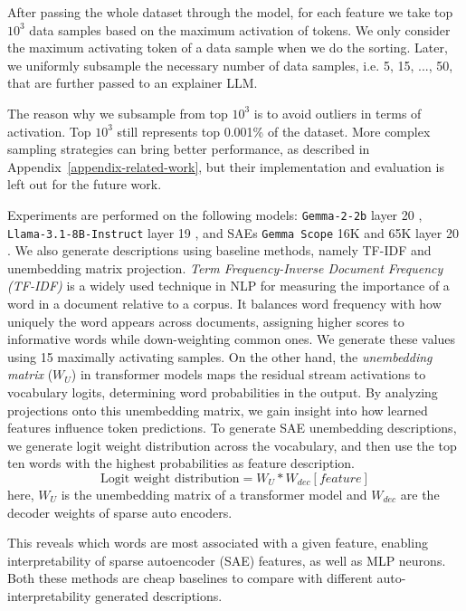 After passing the whole dataset through the model, for each feature we take top $10^3$ data samples based on the maximum activation of tokens. We only consider the maximum activating token of a data sample when we do the sorting. Later, we uniformly subsample the necessary number of data samples, i.e. 5, 15, ..., 50, that are further passed to an explainer LLM. 

The reason why we subsample from top $10^3$ is to avoid outliers in terms of activation. Top $10^3$ still represents top 0.001\% of the dataset. More complex sampling strategies can bring better performance, as described in Appendix~\ref{appendix-related-work}, but their implementation and evaluation is left out for the future work. 

Experiments are performed on the following models: \texttt{Gemma-2-2b} layer 20 \cite{gemmateam2024gemma2improvingopen}, \texttt{Llama-3.1-8B-Instruct} layer 19 \cite{grattafiori2024llama3herdmodels}, and SAEs \texttt{Gemma Scope} 16K and 65K layer 20 \cite{lieberum-etal-2024-gemma}. 
We also generate descriptions using baseline methods, namely TF-IDF and unembedding matrix projection. \textit{Term Frequency-Inverse Document Frequency (TF-IDF)} is a widely used technique in NLP for measuring the importance of a word in a document relative to a corpus. It balances word frequency with how uniquely the word appears across documents, assigning higher scores to informative words while down-weighting common ones. We generate these values using 15 maximally activating samples. On the other hand, the \textit{unembedding matrix} (\( W_U \)) \cite{bloom2024understandingfeatureslogitlens} in transformer models maps the residual stream activations to vocabulary logits, determining word probabilities in the output. By analyzing projections onto this unembedding matrix, we gain insight into how learned features influence token predictions. 
To generate SAE unembedding descriptions, we generate logit weight distribution across the vocabulary, and then use  the top ten words with the highest probabilities as feature description.
\[
\text{Logit weight distribution} = W_U*W_{dec}[feature]
\]
here, \( W_U \) is the unembedding matrix of a transformer model and \( W_{dec}\) are the decoder weights of sparse auto encoders.

This reveals which words are most associated with a given feature, enabling interpretability of sparse autoencoder (SAE) features, as well as MLP neurons. Both these methods are cheap baselines to compare with different auto-interpretability generated descriptions.


